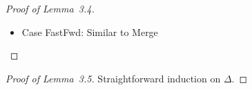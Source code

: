\begin{proof}[Proof of Lemma~3.4]
\begin{itemize}
    \item Case {\sc FastFwd}: Similar to {\sc Merge}

  \end{itemize}

\end{proof}

\begin{proof}[Proof of Lemma~3.5]
  Straightforward induction on $\Delta$.
\end{proof}

